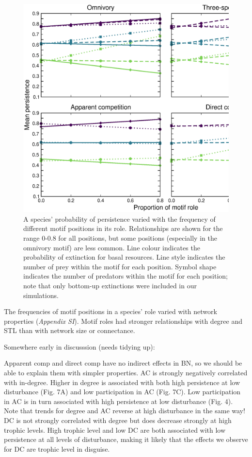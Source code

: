 \documentclass[12pt]{article}
\begin{document}
\begin{spacing}{2.0}
    \begin{figure}[h!]
        \includegraphics[width=.95\textwidth]{figures/persistence_positions_bymotif.eps}
        \caption{A species' probability of persistence varied with the frequency of different motif positions in its role. Relationships are shown for the range 0-0.8 for all positions, but some positions (especially in the omnivory motif) are less common. Line colour indicates the probability of extinction for basal resources. Line style indicates the number of prey within the motif for each position. Symbol shape indicates the number of predators within the motif for each position; note that only bottom-up extinctions were included in our simulations.}
        \label{figs:persistence_position_motifs}
        \end{figure}


        The frequencies of motif positions in a species' role varied with network properties (\emph{Appendix SI}).
        Motif roles had stronger relationships with degree and STL than with network size or connectance.
        


\clearpage

Somewhere early in discusssion (needs tidying up):

Apparent comp and direct comp have no indirect effects in BN, so we should be able to explain them with simpler properties.
AC is strongly negatively correlated with in-degree. Higher in degree is associated with both high persistence at low disturbance (Fig. 7A) and low participation in AC (Fig. 7C). Low participation in AC is in turn associated with high persistence at low disturbance (Fig. 4). Note that trends for degree and AC reverse at high disturbance in the same way!
DC is not strongly correlated with degree but does decrease strongly at high trophic levels. High trophic level and low DC are both associated with low persistence at all levels of disturbance, making it likely that the effects we observe for DC are trophic level in disguise.



\end{spacing}
\end{document}
